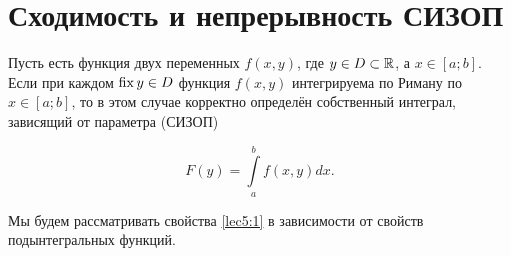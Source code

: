 \documentclass[../../main.tex]{subfiles}
\begin{document}
    \section{Сходимость и непрерывность СИЗОП}
    
    Пусть есть функция двух переменных $f(x,y)$, где $y \in D \subset \mathbb{R}$, 
    а $x \in [a;b]$. Если при каждом $\operatorname{fix} y \in D$ функция
    $f(x, y)$ интегрируема 
    по Риману по $x \in [a;b]$, то в этом случае корректно определён собственный интеграл, зависящий от параметра (СИЗОП)
    
    \begin{equation} \label{lec5:1}
        F(y) = \int\limits_a^b f(x, y)dx.
    \end{equation}

    Мы будем рассматривать свойства \eqref{lec5:1} в зависимости от свойств 
    подынтегральных функций.
\end{document}
